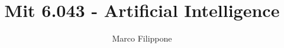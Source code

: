 \documentclass{article}
\begin{document}
\title{Mit 6.043 - Artificial Intelligence}
\author{Marco Filippone}
\maketitle












%

%
\end{document}
